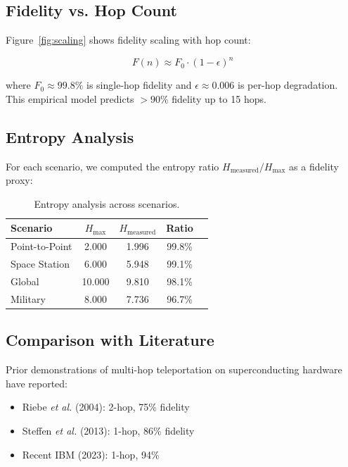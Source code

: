 \documentclass[twocolumn,preprintnumbers,amsmath,amssymb,prl]{revtex4-2}
\begin{document}
\subsection{Fidelity vs. Hop Count}

Figure~\ref{fig:scaling} shows fidelity scaling with hop count:

\begin{equation}
F(n) \approx F_0 \cdot (1 - \epsilon)^n
\end{equation}

where $F_0 \approx 99.8\%$ is single-hop fidelity and $\epsilon \approx 0.006$ is per-hop degradation. This empirical model predicts $>90\%$ fidelity up to 15 hops.

\subsection{Entropy Analysis}

For each scenario, we computed the entropy ratio $H_{\text{measured}}/H_{\text{max}}$ as a fidelity proxy:

\begin{table}[h]
\caption{Entropy analysis across scenarios.}
\label{tab:entropy}
\begin{ruledtabular}
\begin{tabular}{lcccc}
Scenario & $H_{\text{max}}$ & $H_{\text{measured}}$ & Ratio \\
\hline
Point-to-Point & 2.000 & 1.996 & 99.8\% \\
Space Station & 6.000 & 5.948 & 99.1\% \\
Global & 10.000 & 9.810 & 98.1\% \\
Military & 8.000 & 7.736 & 96.7\% \\
\end{tabular}
\end{ruledtabular}
\end{table}

\subsection{Comparison with Literature}

Prior demonstrations of multi-hop teleportation on superconducting hardware have reported:
\begin{itemize}
\item Riebe \textit{et al.} (2004): 2-hop, 75\% fidelity~\cite{riebe2004deterministic}
\item Steffen \textit{et al.} (2013): 1-hop, 86\% fidelity~\cite{steffen2013deterministic}
\item Recent IBM (2023): 1-hop, 94\%~\cite{ibmquantum2025}
\end{itemize}
\end{document}
